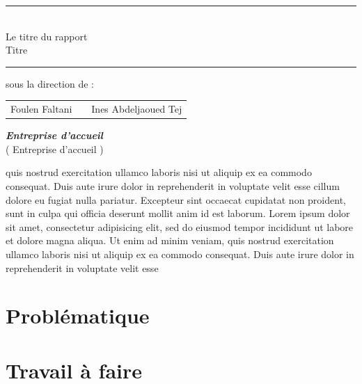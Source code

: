 \documentclass{article}
\newcommand{\reportSubject} {%
  Le titre du rapport \\ Titre%
}
\newcommand{\studyDepartment} {%
  Entreprise d'accueil %
}
\begin{document}
\begin{titlepage}
\begin{center}
\vspace{10pt} {%
  \renewcommand*{\familydefault}{\defaultFont}
  \fontsize{27pt}{27pt}\selectfont%
  \rule{0.5\textwidth}{.4pt}\\
  \vspace{10pt}
  \reportSubject{}\\%
  \vspace{10pt}
  \rule{0.5\textwidth}{.4pt}
}

\vspace{10pt}
sous la direction de :\\
\vspace{20pt}
\begin{tabular}{ccc}
Foulen Faltani &\qquad\qquad & Ines Abdeljaoued Tej \\
\end{tabular}

\vspace{30pt}%
\textbf{\textit{Entreprise d'accueil}}\\

\vspace{10pt}
(\studyDepartment)\\
\end{center}
\end{titlepage}


\tableofcontents

\vspace{6cm}

quis nostrud exercitation ullamco laboris nisi ut aliquip ex ea commodo
consequat. Duis aute irure dolor in reprehenderit in voluptate velit esse
cillum dolore eu fugiat nulla pariatur. Excepteur sint occaecat cupidatat non
proident, sunt in culpa qui officia deserunt mollit anim id est laborum. Lorem ipsum dolor sit amet, consectetur adipisicing elit, sed do eiusmod
tempor incididunt ut labore et dolore magna aliqua. Ut enim ad minim veniam,
quis nostrud exercitation ullamco laboris nisi ut aliquip ex ea commodo
consequat. Duis aute irure dolor in reprehenderit in voluptate velit esse

\section{Problématique}
\section{Travail à faire}



\end{document}
